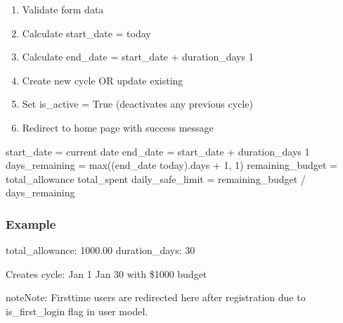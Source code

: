 \documentclass[letterpaper,10pt,english]{sphinxmanual}
\begin{document}
\begin{fulllineitems}
\begin{description}
\begin{description}
\begin{enumerate}
%
\item {} 
\sphinxAtStartPar
Validate form data

\item {} 
\sphinxAtStartPar
Calculate start\_date = today

\item {} 
\sphinxAtStartPar
Calculate end\_date = start\_date + duration\_days \sphinxhyphen{} 1

\item {} 
\sphinxAtStartPar
Create new cycle OR update existing

\item {} 
\sphinxAtStartPar
Set is\_active = True (deactivates any previous cycle)

\item {} 
\sphinxAtStartPar
Redirect to home page with success message

\end{enumerate}

\end{description}

\sphinxAtStartPar
start\_date = current date
end\_date = start\_date + duration\_days \sphinxhyphen{} 1
days\_remaining = max((end\_date \sphinxhyphen{} today).days + 1, 1)
remaining\_budget = total\_allowance \sphinxhyphen{} total\_spent
daily\_safe\_limit = remaining\_budget / days\_remaining

\end{description}
\subsubsection*{Example}
\begin{description}
\sphinxAtStartPar
total\_allowance: 1000.00
duration\_days: 30

\end{description}

\sphinxAtStartPar
Creates cycle: Jan 1 \sphinxhyphen{} Jan 30 with \$1000 budget

\begin{sphinxadmonition}{note}{Note:}
\sphinxAtStartPar
First\sphinxhyphen{}time users are redirected here after registration
due to is\_first\_login flag in user model.
\end{sphinxadmonition}

\end{fulllineitems}
\end{document}
